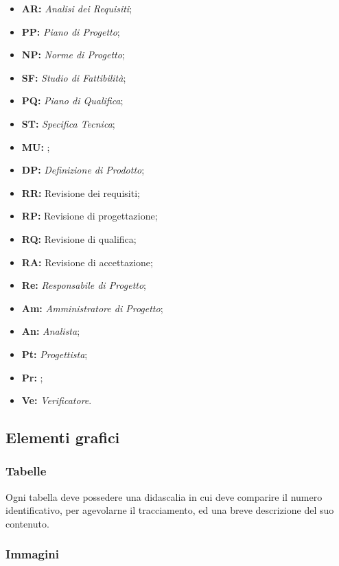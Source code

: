 \documentclass[../NormediProgetto.tex]{subfiles}
\begin{document}
\begin{itemize}
\item{\textbf{AR:}} \textit{Analisi dei Requisiti};
\item{\textbf{PP:}} \textit{Piano di Progetto};
\item{\textbf{NP:}} \textit{Norme di Progetto};
\item{\textbf{SF:}} \textit{Studio di Fattibilità};
\item{\textbf{PQ:}} \textit{Piano di Qualifica};
\item{\textbf{ST:}} \textit{Specifica Tecnica};
\item{\textbf{MU:}} ;
\item{\textbf{DP:}} \textit{Definizione di Prodotto};
\item{\textbf{RR:}} Revisione dei requisiti;
\item{\textbf{RP:}} Revisione di progettazione;
\item{\textbf{RQ:}} Revisione di qualifica;
\item{\textbf{RA:}} Revisione di accettazione;
\item{\textbf{Re:}} \textit{Responsabile di Progetto};
\item{\textbf{Am:}} \textit{Amministratore di Progetto};
\item{\textbf{An:}} \textit{Analista};
\item{\textbf{Pt:}} \textit{Progettista};
\item{\textbf{Pr:}} ;
\item{\textbf{Ve:}} \textit{Verificatore}.
\end{itemize}

\subsection{Elementi grafici}

\subsubsection{Tabelle}

Ogni tabella deve possedere una didascalia in cui deve comparire il numero identificativo, per agevolarne il tracciamento, ed una breve descrizione del suo contenuto.

\subsubsection{Immagini}
\end{document}
